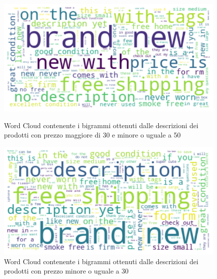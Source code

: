 \begin{figure}[H]
   \begin{minipage}{0.48\textwidth}
     \centering
     \includegraphics[width=.9\linewidth]{30_50}
	\caption{Word Cloud contenente i bigrammi ottenuti dalle descrizioni dei prodotti con prezzo maggiore di 30 e minore o uguale a 50}
	\label{fig:30_50}   
	\end{minipage}\hfill
   \begin{minipage}{0.48\textwidth}
     \centering
     \includegraphics[width=.9\linewidth]{minore_30}
     \caption{Word Cloud contenente i bigrammi ottenuti dalle descrizioni dei prodotti con prezzo minore o uguale a 30}
     \label{Fig:minore_30}
   \end{minipage}
\end{figure}
